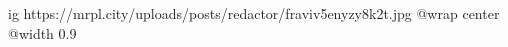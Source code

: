  
 
 
 
 

\ifcmt
  ig https://mrpl.city/uploads/posts/redactor/fraviv5enyzy8k2t.jpg
  @wrap center
  @width 0.9
\fi
